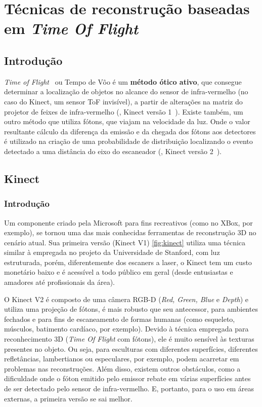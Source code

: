 \chapter{Técnicas de reconstrução baseadas em \emph{Time Of Flight}}\label{cap:kinect}

\section*{Introdução}

\emph{Time of Flight}~\cite{gokturk2004time} ou Tempo de Vôo é um \textbf{método ótico ativo}, que consegue determinar a localização de objetos no alcance do sensor de infra-vermelho (no caso do Kinect, um sensor ToF invisível), a partir de alterações na matriz do projetor de feixes de infra-vermelho (\eg, Kinect versão 1~\cite{smisek20133d}). Existe também, um outro método que utiliza fótons, que viajam na velocidade da luz. Onde o valor resultante cálculo da diferença da emissão e da chegada dos fótons aos detectores é utilizado na criação de uma probabilidade de distribuição localizando o evento detectado a uma distância do eixo do escaneador (\eg, Kinect versão 2~\cite{lachat2015first,valgma20163d}). 

\section{Kinect}

\subsection*{Introdução}

Um componente criado pela Microsoft para fins recreativos (como no XBox, por exemplo), se tornou uma das mais conhecidas ferramentas de reconstrução 3D no cenário atual. Sua primeira versão (Kinect V1) \ref{fig:kinect} utiliza uma técnica similar à empregada no projeto da Universidade de Stanford, com luz estruturada, porém, diferentemente dos escaners a laser, o Kinect tem um custo monetário baixo e é acessível a todo público em geral (desde entusiastas e amadores até profissionais da área). 

O Kinect V2 é composto de uma câmera RGB-D (\emph{Red, Green, Blue} e \emph{Depth}) e utiliza uma projeção de fótons, é mais robusto que seu antecessor, para ambientes fechados e para fins de escaneamento de formas humanas (como esqueleto, músculos, batimento cardíaco, por exemplo). Devido à técnica empregada para reconhecimento 3D (\emph{Time Of Flight} com fótons), ele é muito sensível às texturas presentes no objeto. Ou seja, para esculturas com diferentes superfícies, diferentes refletâncias, lambertianos ou especulares, por exemplo, podem acarretar em problemas nas reconstruções. Além disso, existem outros obstáculos, como a dificuldade onde o fóton emitido pelo emissor rebate em várias superfícies antes de ser detectado pelo sensor de infra-vermelho. E, portanto, para o uso em áreas externas, a primeira versão se sai melhor.

